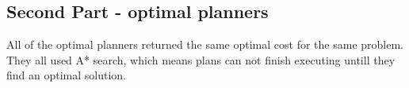 \documentclass{article}
\begin{document}
\subsection{Second Part - optimal planners}

\begin{table}[H]
\centering
{}
All of the optimal planners returned the same optimal cost for the same problem. They all used A* search, which means plans can not finish executing untill they find an optimal solution. 
\end{table}
\end{document}
